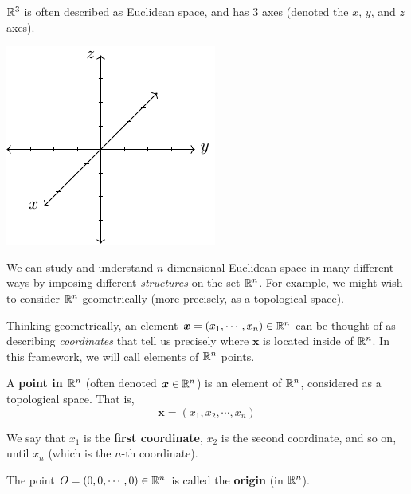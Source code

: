 \begin{example}
    $\mathbb{R}^3$ is often described as Euclidean space, and has 3 axes (denoted the $x$, $y$, and $z$ axes).
    
        \begin{center}        
        \includegraphics{chapters/1-LinearAlgebra/figures/figures-r3.pdf}
    \end{center}
    
\end{example}


We can study and understand $n$-dimensional Euclidean space in many different ways by imposing different \textit{structures} on the set $\mathbb{R}^n$.  For example, we might wish to consider $\mathbb{R}^n$ geometrically (more precisely, as a topological space).

Thinking geometrically, an element $\bm{x} = (x_1, \cdots ,x_n) \in \mathbb{R}^n$ can be thought of as describing \textit{coordinates} that tell us precisely where $\bm{x}$ is located inside of $\mathbb{R}^n$.  In this framework, we will call elements of $\mathbb{R}^n$ points.

\begin{definition}
A \textbf{point in $\mathbb{R}^n$} (often denoted $\bm{x} \in \mathbb{R}^n$) is an element of $\mathbb{R}^n$, considered as a topological space.  That is, 
$$\bm{x} = (x_1, x_2, \cdots, x_n)$$

We say that $x_1$ is the \textbf{first coordinate}, $x_2$ is the second coordinate, and so on, until $x_n$ (which is the $n$-th coordinate).
\end{definition}

\begin{example}
    The point $O = (0, 0, \cdots, 0) \in \mathbb{R}^n$ is called the \textbf{origin} (in $\mathbb{R}^n$). 
\end{example}

